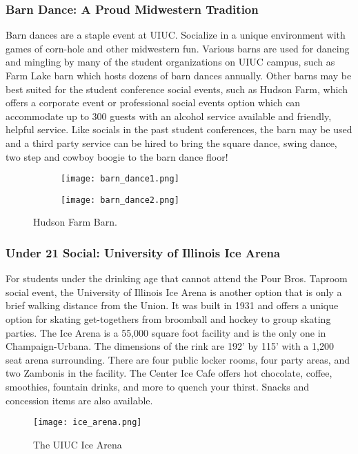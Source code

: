 \subsubsection{Barn Dance: A Proud Midwestern Tradition}
Barn dances are a staple event at UIUC. Socialize in a unique environment with games of corn-hole and other midwestern fun. Various barns are used for dancing and mingling by many of the student organizations on UIUC campus, such as Farm Lake barn which hosts dozens of barn dances annually. Other barns may be best suited for the student conference social events, such as Hudson Farm, which offers a corporate event or professional social events option which can accommodate up to 300 guests with an alcohol service available and friendly, helpful service. Like socials in the past student conferences, the barn may be used and a third party service can be hired to bring the square dance, swing dance, two step and cowboy boogie to the barn dance floor! 
\vspace{0.5cm}\newline
\begin{figure}[H]
	\centering
	\begin{subfigure}{0.5\textwidth}
		\centering
		\texttt{[image: barn\_dance1.png]}
	\end{subfigure}%
	\begin{subfigure}{0.5\textwidth}
		\centering
		\texttt{[image: barn\_dance2.png]}
	\end{subfigure}	
	\caption{Hudson Farm Barn.}	
\end{figure} 

\subsubsection{Under 21 Social: University of Illinois Ice Arena}
For students under the drinking age that cannot attend the Pour Bros. Taproom social event, the University of Illinois Ice Arena is another option that is only a brief walking distance from the Union. It was built in 1931 and offers a unique option for skating get-togethers from broomball and hockey to group skating parties. The Ice Arena is a 55,000 square foot facility and is the only one in Champaign-Urbana. The dimensions of the rink are 192' by 115' with a 1,200 seat arena surrounding. There are four public locker rooms, four party areas, and two Zambonis in the facility. The Center Ice Cafe offers hot chocolate, coffee, smoothies, fountain drinks, and more to quench your thirst.  Snacks and concession items are also available.
\vspace{0.5cm}\newline
\begin{figure}[H]
	\centering
	\texttt{[image: ice\_arena.png]}
	\caption{The UIUC Ice Arena}
\end{figure}

